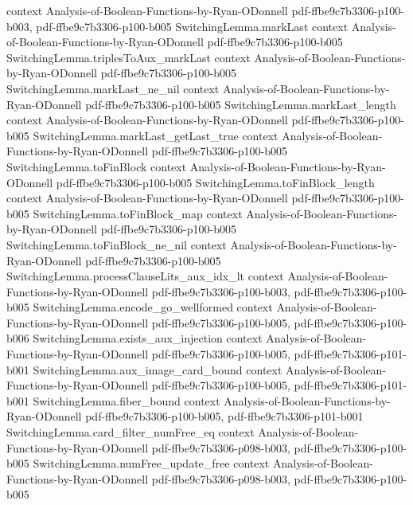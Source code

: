 \begin{theorem}
  {context}
  {Analysis-of-Boolean-Functions-by-Ryan-ODonnell}
  {pdf-ffbe9c7b3306-p100-b003,
    pdf-ffbe9c7b3306-p100-b005}
\proofstep
  {SwitchingLemma.markLast}
  {context}
  {Analysis-of-Boolean-Functions-by-Ryan-ODonnell}
  {pdf-ffbe9c7b3306-p100-b005}
\proofstep
  {SwitchingLemma.triplesToAux_markLast}
  {context}
  {Analysis-of-Boolean-Functions-by-Ryan-ODonnell}
  {pdf-ffbe9c7b3306-p100-b005}
\proofstep
  {SwitchingLemma.markLast_ne_nil}
  {context}
  {Analysis-of-Boolean-Functions-by-Ryan-ODonnell}
  {pdf-ffbe9c7b3306-p100-b005}
\proofstep
  {SwitchingLemma.markLast_length}
  {context}
  {Analysis-of-Boolean-Functions-by-Ryan-ODonnell}
  {pdf-ffbe9c7b3306-p100-b005}
\proofstep
  {SwitchingLemma.markLast_getLast_true}
  {context}
  {Analysis-of-Boolean-Functions-by-Ryan-ODonnell}
  {pdf-ffbe9c7b3306-p100-b005}
\proofstep
  {SwitchingLemma.toFinBlock}
  {context}
  {Analysis-of-Boolean-Functions-by-Ryan-ODonnell}
  {pdf-ffbe9c7b3306-p100-b005}
\proofstep
  {SwitchingLemma.toFinBlock_length}
  {context}
  {Analysis-of-Boolean-Functions-by-Ryan-ODonnell}
  {pdf-ffbe9c7b3306-p100-b005}
\proofstep
  {SwitchingLemma.toFinBlock_map}
  {context}
  {Analysis-of-Boolean-Functions-by-Ryan-ODonnell}
  {pdf-ffbe9c7b3306-p100-b005}
\proofstep
  {SwitchingLemma.toFinBlock_ne_nil}
  {context}
  {Analysis-of-Boolean-Functions-by-Ryan-ODonnell}
  {pdf-ffbe9c7b3306-p100-b005}
\proofstep
  {SwitchingLemma.processClauseLits_aux_idx_lt}
  {context}
  {Analysis-of-Boolean-Functions-by-Ryan-ODonnell}
  {pdf-ffbe9c7b3306-p100-b003,
    pdf-ffbe9c7b3306-p100-b005}
\proofstep
  {SwitchingLemma.encode_go_wellformed}
  {context}
  {Analysis-of-Boolean-Functions-by-Ryan-ODonnell}
  {pdf-ffbe9c7b3306-p100-b005,
    pdf-ffbe9c7b3306-p100-b006}
\proofstep
  {SwitchingLemma.exists_aux_injection}
  {context}
  {Analysis-of-Boolean-Functions-by-Ryan-ODonnell}
  {pdf-ffbe9c7b3306-p100-b005,
    pdf-ffbe9c7b3306-p101-b001}
\proofstep
  {SwitchingLemma.aux_image_card_bound}
  {context}
  {Analysis-of-Boolean-Functions-by-Ryan-ODonnell}
  {pdf-ffbe9c7b3306-p100-b005,
    pdf-ffbe9c7b3306-p101-b001}
\proofstep
  {SwitchingLemma.fiber_bound}
  {context}
  {Analysis-of-Boolean-Functions-by-Ryan-ODonnell}
  {pdf-ffbe9c7b3306-p100-b005,
    pdf-ffbe9c7b3306-p101-b001}
\proofstep
  {SwitchingLemma.card_filter_numFree_eq}
  {context}
  {Analysis-of-Boolean-Functions-by-Ryan-ODonnell}
  {pdf-ffbe9c7b3306-p098-b003,
    pdf-ffbe9c7b3306-p100-b005}
\proofstep
  {SwitchingLemma.numFree_update_free}
  {context}
  {Analysis-of-Boolean-Functions-by-Ryan-ODonnell}
  {pdf-ffbe9c7b3306-p098-b003,
    pdf-ffbe9c7b3306-p100-b005}

\end{theorem}
